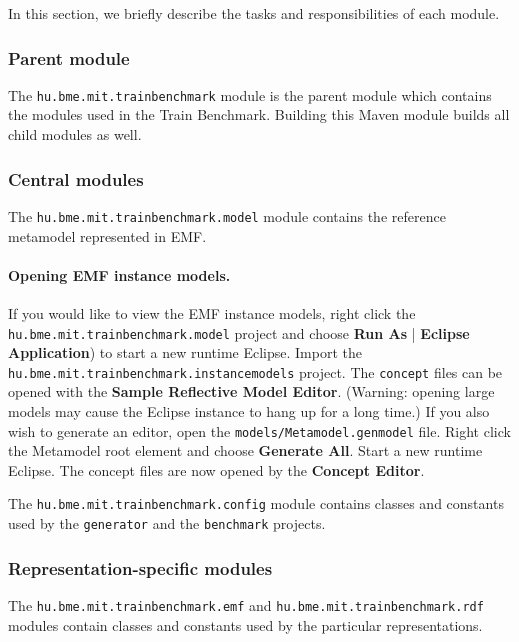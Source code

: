In this section, we briefly describe the tasks and responsibilities of each module.

\subsubsection{Parent module}

The \texttt{hu.bme.mit.trainbenchmark} module is the parent module which contains the modules used in the Train Benchmark. Building this Maven module builds all child modules as well.

\subsubsection{Central modules}

The \texttt{hu.bme.mit.trainbenchmark.model} module contains the reference metamodel represented in EMF.

\paragraph{Opening EMF instance models.} If you would like to view the EMF instance models, right click the \texttt{hu.bme.mit.trainbenchmark.model} project and choose \textbf{Run As} | \textbf{Eclipse Application}) to start a new runtime Eclipse. Import the \texttt{hu.bme.mit.trainbenchmark.instancemodels} project. The \texttt{concept} files can be opened with the \textbf{Sample Reflective Model Editor}. (Warning: opening large models may cause the Eclipse instance to hang up for a long time.) If you also wish to generate an editor, open the \texttt{models/Metamodel.genmodel} file. Right click the \textsf{Metamodel} root element and choose \textbf{Generate All}. Start a new runtime Eclipse. The \textsf{concept} files are now opened by the \textbf{Concept Editor}.

The \texttt{hu.bme.mit.trainbenchmark.config} module contains classes and constants used by the \texttt{generator} and the \texttt{benchmark} projects.


\subsubsection{Representation-specific modules}

The \texttt{hu.bme.mit.trainbenchmark.emf} and \texttt{hu.bme.mit.trainbenchmark.rdf} modules contain classes and constants used by the particular representations.



